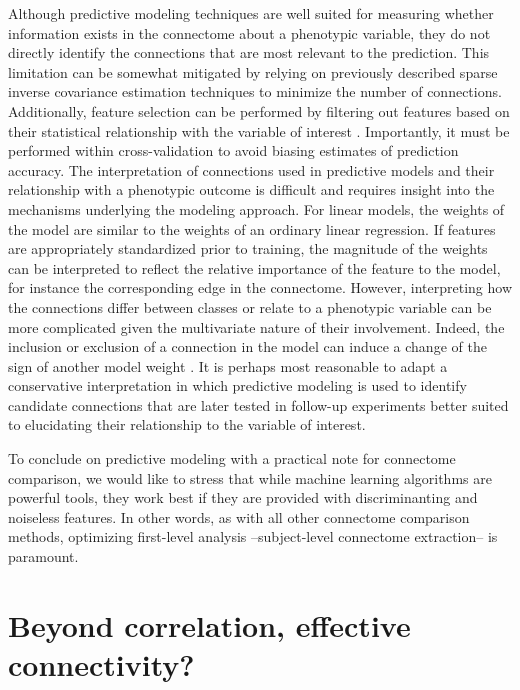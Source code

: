 \documentclass[5p]{elsarticle}
\begin{document}
Although predictive modeling techniques are well suited for measuring whether
information exists in the connectome about a phenotypic variable, they do
not directly identify the connections that are most relevant to the
prediction.  This limitation can be somewhat mitigated  by
relying on previously described sparse inverse covariance estimation techniques to minimize
the number of connections. Additionally, feature selection \cite{guyon2003} 
can be performed by filtering out
features based on their statistical relationship with the variable of interest
\cite{craddock2009, shen2010}. Importantly, it must be performed within
cross-validation to avoid biasing estimates of prediction accuracy.
% 
The interpretation of connections used in predictive models and their
relationship with
a phenotypic outcome is difficult and requires insight into the mechanisms
underlying the modeling approach. For linear models, the weights of the
model are similar to the weights of
an ordinary linear regression. If features are appropriately standardized
prior to training, the magnitude of the weights can be interpreted to reflect
the relative importance of the feature to the model, for instance the
corresponding edge in the connectome. However,
interpreting how the connections differ between classes or relate to a
phenotypic variable can be more complicated given the multivariate nature
of their involvement.
Indeed, the inclusion or exclusion of a connection in the model
can induce a change of the sign of another model weight \cite{craddock2009}.
 It
is perhaps most reasonable to adapt a conservative interpretation in which
predictive modeling is used to identify candidate connections that are later
tested in follow-up experiments better suited to elucidating their relationship
to the variable of interest.

To conclude on predictive modeling with a practical note for connectome
comparison, we would like to stress that while machine learning algorithms are
powerful tools, they work best if they are provided with discriminanting and
noiseless features. In other words, as with all other connectome comparison
methods, optimizing first-level analysis --subject-level connectome extraction--
is paramount.


\section{Beyond correlation, effective connectivity?}
\end{document}
